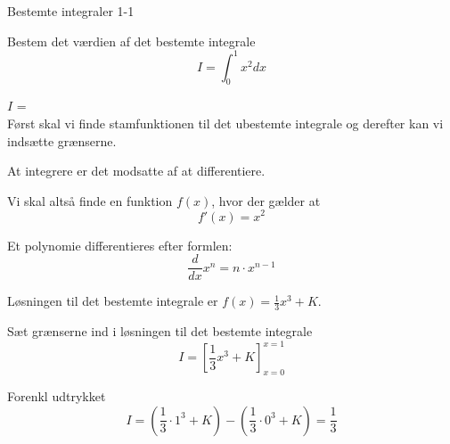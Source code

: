 \documentclass{article}
\begin{document}
\tableofcontents

\begin{exercise}{Bestemte integraler 1-1}

Bestem det værdien af det bestemte integrale
\[
I = \int_0^1 x^2 dx
\]

$I$ =  \\


\hint
Først skal vi finde stamfunktionen til det ubestemte integrale og derefter kan vi indsætte grænserne.

\hint
At integrere er det modsatte af at differentiere.

\hint
Vi skal altså finde en funktion $f(x)$, hvor der gælder at
\[
f'(x) = x^2
\]

\hint
Et polynomie differentieres efter formlen:
\[
\frac{d}{dx} x^n = n \cdot x^{n - 1}
\]

\hint
Løsningen til det bestemte integrale er $f(x) = \frac{1}{3} x^3 + K$.

\hint
Sæt grænserne ind i løsningen til det bestemte integrale
\[
I = \left[ \frac{1}{3} x^3 + K \right]_{x=0}^{x=1}
\]

\hint
Forenkl udtrykket
\[
I = \left( \frac{1}{3} \cdot 1^3 + K \right) - \left( \frac{1}{3} \cdot 0^3 + K \right) = \frac{1}{3}
\]


\end{exercise}
\end{document}

